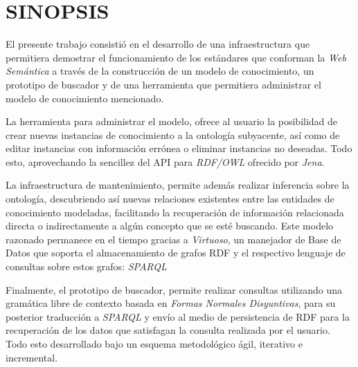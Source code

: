 \chapter*{SINOPSIS}

El presente trabajo consistió en el desarrollo de una infraestructura que permitiera demostrar el funcionamiento de los estándares que conforman la \textit{Web Semántica} a través de la construcción de un modelo de conocimiento, un prototipo de buscador y de una herramienta que permitiera administrar el modelo de conocimiento mencionado.

La herramienta para administrar el modelo, ofrece al usuario la posibilidad de crear nuevas instancias de conocimiento a la ontología subyacente, así como de editar instancias con información errónea o eliminar instancias no deseadas. Todo esto, aprovechando la sencillez del API para \textit{RDF/OWL} ofrecido por \textit{Jena}.

La infraestructura de mantenimiento, permite además realizar inferencia sobre la ontología, descubriendo así nuevas relaciones existentes entre las entidades de conocimiento modeladas, facilitando la recuperación de información relacionada directa o indirectamente a algún concepto que se esté buscando. Este modelo razonado permanece en el tiempo gracias a \textit{Virtuoso}, un manejador de Base de Datos que soporta el almacenamiento de grafos RDF y el respectivo lenguaje de consultas sobre estos grafos: \textit{SPARQL}

Finalmente, el prototipo de buscador, permite realizar consultas utilizando una gramática libre de contexto basada en \textit{Formas Normales Disyuntivas}, para su posterior traducción a \textit{SPARQL} y envío al medio de persistencia de RDF para la recuperación de los datos que satisfagan la consulta realizada por el usuario. Todo esto desarrollado bajo un esquema metodológico ágil, iterativo e incremental.
